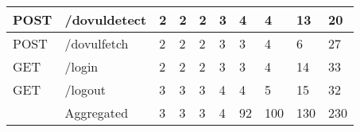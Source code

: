 \begin{table*}[h]
\begin{tabular}{|p{}|p{}|p{}|p{}|p{}|p{}|p{}|p{}|p{}|p{}|}
    POST                                  & /dovuldetect                       & 2                                          & 2                                          & 2                                          & 3                                          & 4                                          & 4                                          & 13                                         & 20                                          \\ \hline
    POST                                  & /dovulfetch                        & 2                                          & 2                                          & 2                                          & 3                                          & 3                                          & 4                                          & 6                                          & 27                                          \\ \hline
    GET                                   & /login                             & 2                                          & 2                                          & 2                                          & 3                                          & 3                                          & 4                                          & 14                                         & 33                                          \\ \hline
    GET                                   & /logout                            & 3                                          & 3                                          & 3                                          & 4                                          & 4                                          & 5                                          & 15                                         & 32                                          \\ \hline
                                          & Aggregated                         & 3                                          & 3                                          & 3                                          & 4                                          & 92                                         & 100                                        & 130                                        & 230                                         \\ \hline
    \end{tabular}
  \end{table*}